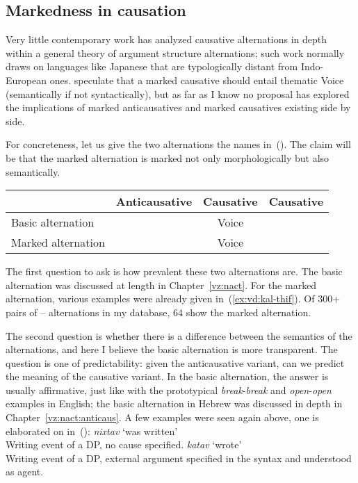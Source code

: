 		\subsection{Markedness in causation} \label{vd:caus:marked}
Very little contemporary work has analyzed causative alternations in depth within a general theory of argument structure alternations; such work normally draws on languages like Japanese \citep{jacobsen92} that are typologically distant from Indo-European ones. \citet[62ff]{layering15} speculate that a marked causative should entail thematic Voice (semantically if not syntactically), but as far as I know no proposal has explored the implications of marked anticausatives and marked causatives existing side by side.

For concreteness, let us give the two alternations the names in~(\nextx). The claim will be that the marked alternation is marked not only morphologically but also semantically.
\ex
\begin{tabular}{l|ccc}
	&	Anticausative & Causative & Causative\\\hline
Basic alternation	& {\vz} & Voice &   \\
Marked alternation		&		&  Voice & {\vd}\\
\end{tabular}
\xe

The first question to ask is how prevalent these two alternations are. The basic alternation was discussed at length in Chapter~\ref{vz:nact}. For the marked alternation, various examples were already given in~(\ref{ex:vd:kal-thif}). Of 300+ pairs of {\tkal}--{\thif} alternations in my database, 64 show the marked alternation.%

%
%

The second question is whether there is a difference between the semantics of the alternations, and here I believe the basic alternation is more transparent. The question is one of predictability: given the anticausative variant, can we predict the meaning of the causative variant. In the basic alternation, the answer is usually affirmative, just like with the prototypical \emph{break}-\emph{break} and \emph{open}-\emph{open} examples in English; the basic alternation in Hebrew was discussed in depth in Chapter~\ref{vz:nact:anticaus}. A few examples were seen again above, one is elaborated on in~(\nextx):
\pex
	\a \emph{nixtav} `was written'\\
		Writing event of a DP, no cause specified.
	\a \emph{katav} `wrote'\\
		Writing event of a DP, external argument specified in the syntax and understood as agent.
\xe

